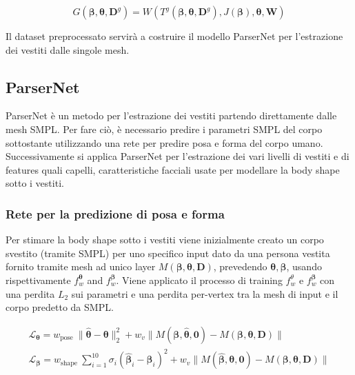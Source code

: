 \medskip

\begin{equation*}
G\left(\boldsymbol{\beta}, \boldsymbol{\theta}, \mathbf{D}^{g}\right)=W\left(T^{g}\left(\boldsymbol{\beta}, \boldsymbol{\theta}, \mathbf{D}^{g}\right), J(\boldsymbol{\beta}), \boldsymbol{\theta}, \mathbf{W}\right)
\end{equation*}

\medskip

Il dataset preprocessato servirà a costruire il modello ParserNet per l'estrazione dei vestiti dalle singole mesh.

\medskip

\subsection{ParserNet}

\medskip

ParserNet è un metodo per l'estrazione dei vestiti partendo direttamente dalle mesh SMPL. Per fare ciò, è necessario predire i parametri SMPL del corpo sottostante utilizzando una rete per predire posa e forma del corpo umano. Successivamente si applica ParserNet per l'estrazione dei vari livelli di vestiti e di features quali capelli, caratteristiche facciali usate per modellare la body shape sotto i vestiti.

\medskip

\subsubsection{Rete per la predizione di posa e forma}

Per stimare la body shape sotto i vestiti viene inizialmente creato un corpo svestito (tramite SMPL) per uno specifico input dato da una persona vestita fornito tramite mesh ad unico layer $M(\boldsymbol{\beta}, \boldsymbol{\theta}, \mathbf{D})$, prevedendo $\boldsymbol{\theta}, \boldsymbol{\beta}$, usando rispettivamente $f_{w}^{\boldsymbol{\theta}}$ and $f_{w}^{\boldsymbol{\beta}}$. Viene applicato il processo di training $f_{w}^{\theta}$ e $f_{w}^{\boldsymbol{\beta}}$ con una perdita $L_{2}$ sui parametri e una perdita per-vertex tra la mesh di input e il corpo predetto da SMPL. 

\medskip

\begin{equation*}
\begin{gathered}
\mathcal{L}_{\boldsymbol{\theta}}=w_{\text {pose }}\|\hat{\boldsymbol{\theta}}-\boldsymbol{\theta}\|_{2}^{2}+w_{v}\|M(\boldsymbol{\beta}, \hat{\boldsymbol{\theta}}, \mathbf{0})-M(\boldsymbol{\beta}, \boldsymbol{\theta}, \mathbf{D})\| \\
\mathcal{L}_{\boldsymbol{\beta}}=w_{\text {shape }} \sum_{i=1}^{10} \sigma_{i}\left(\hat{\boldsymbol{\beta}}_{i}-\boldsymbol{\beta}_{i}\right)^{2}+w_{v}\|M(\hat{\boldsymbol{\beta}}, \boldsymbol{\theta}, \mathbf{0})-M(\boldsymbol{\beta}, \boldsymbol{\theta}, \mathbf{D})\|
\end{gathered}
\end{equation*}

